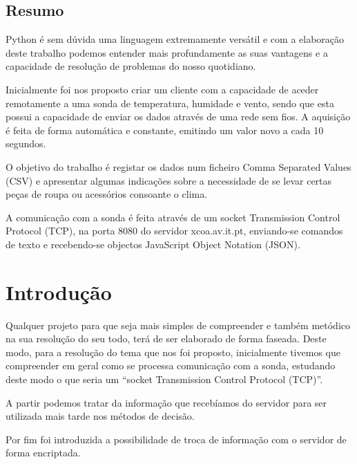 \documentclass[a4paper,12pt]{report}
\begin{document}
\clearpage

\section{Resumo}
Python é sem dúvida uma linguagem extremamente versátil e com a elaboração deste trabalho podemos entender mais profundamente as suas vantagens e a capacidade de resolução de problemas do nosso quotidiano.\par
Inicialmente foi nos proposto criar um cliente com a capacidade de aceder remotamente a uma sonda de temperatura, humidade e vento, sendo que esta possui a capacidade de enviar os dados através de uma rede sem fios. A aquisição é feita de forma automática e constante, emitindo um valor novo a cada 10 segundos.\par
O objetivo do trabalho é registar os dados num ficheiro Comma Separated Values (CSV) e apresentar algumas indicações sobre a necessidade de se levar certas peças de roupa ou acessórios consoante o clima.\par
A comunicação com a sonda é feita através de um socket Transmission Control Protocol (TCP), na porta 8080 do servidor xcoa.av.it.pt, enviando-se comandos de texto e recebendo-se objectos JavaScript Object Notation (JSON).




\begingroup
\tableofcontents
\endgroup
\clearpage


\listoffigures
\clearpage




\chapter{Introdução}
\label{introducao}
Qualquer projeto para que seja mais simples de compreender e também metódico na sua resolução do seu todo, terá de ser elaborado de forma faseada. Deste modo, para a resolução do tema que nos foi proposto, inicialmente tivemos que compreender em geral como se processa  comunicação com a sonda, estudando deste modo o que seria um “socket Transmission Control Protocol (TCP)”.\par
A partir podemos tratar da informação que recebíamos do servidor para ser utilizada mais tarde nos métodos de decisão.\par
Por fim foi introduzida a possibilidade de troca de informação com o servidor de forma encriptada.
\end{document}
